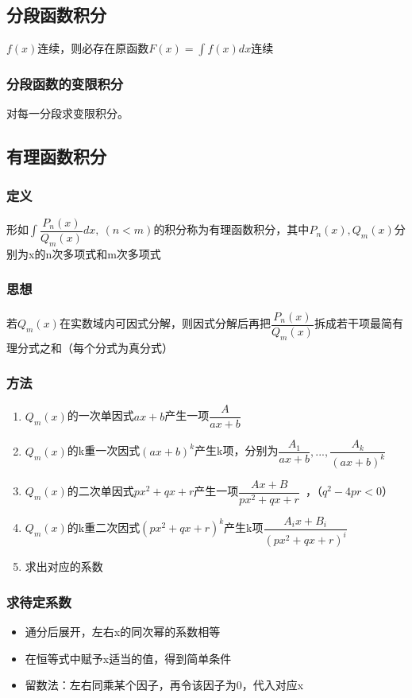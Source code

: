 \subsection{分段函数积分}
\(f(x)\)连续，则必存在原函数\(F(x) = \displaystyle\int f(x)dx\)连续

\subsubsection{分段函数的变限积分}
对每一分段求变限积分。


\subsection{有理函数积分}

\subsubsection{定义}
形如\(\displaystyle\int\dfrac{P_n(x)}{Q_m(x)}dx,\ (n < m)\)的积分称为有理函数积分，其中\(P_n(x), Q_m(x)\)分别为x的n次多项式和m次多项式

\subsubsection{思想}
若\(Q_m(x)\)在实数域内可因式分解，则因式分解后再把\(\dfrac{P_n(x)}{Q_m(x)}\)拆成若干项最简有理分式之和（每个分式为真分式）

\subsubsection{方法}
\begin{enumerate}
    \item \(Q_m(x)\)的一次单因式\(ax + b\)产生一项\(\dfrac{A}{ax + b}\)
    \item \(Q_m(x)\)的k重一次因式\((ax + b)^k\)产生k项，分别为\(\dfrac{A_1}{ax + b}, ..., \dfrac{A_k}{(ax + b)^k}\)
    \item \(Q_m(x)\)的二次单因式\(px^2 + qx + r\)产生一项\(\dfrac{Ax + B}{px^2 + qx + r}\)\ ，（\(q^2 - 4pr < 0\)）
    \item \(Q_m(x)\)的k重二次因式\((px^2 + qx + r)^k\)产生k项\(\dfrac{A_ix + B_i}{(px^2 + qx + r)^i}\)
    \item 求出对应的系数
\end{enumerate}

\subsubsection{求待定系数}
\begin{itemize}
    \item 通分后展开，左右x的同次幂的系数相等
    \item 在恒等式中赋予x适当的值，得到简单条件
    \item 留数法：左右同乘某个因子，再令该因子为0，代入对应x
\end{itemize}


